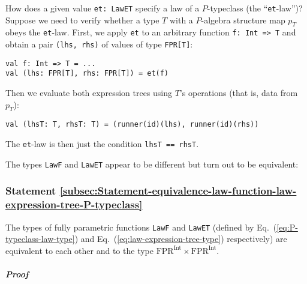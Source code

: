 How does a given value \lstinline!et: LawET!
specify a law of a $P$-typeclass (the \textsf{``}\lstinline!et!-law\textsf{''})?
Suppose we need to verify whether a type $T$ with a $P$-algebra
structure map $p_{T}$ obeys the \lstinline!et!-law.
First, we apply \lstinline!et!
to an arbitrary function \lstinline!f: Int => T!
and obtain a pair \lstinline!(lhs, rhs)!
of values of type \lstinline!FPR[T]!:
\begin{lstlisting}
val f: Int => T = ...
val (lhs: FPR[T], rhs: FPR[T]) = et(f)
\end{lstlisting}
Then we evaluate both expression trees using $T$\textsf{'}s operations (that
is, data from $p_{T}$):
\begin{lstlisting}
val (lhsT: T, rhsT: T) = (runner(id)(lhs), runner(id)(rhs))
\end{lstlisting}
The \lstinline!et!-law
is then just the condition \lstinline!lhsT == rhsT!.

The types \lstinline!LawF!
and \lstinline!LawET! appear
to be different but turn out to be equivalent:

\subsubsection{Statement \label{subsec:Statement-equivalence-law-function-law-expression-tree-P-typeclass}\ref{subsec:Statement-equivalence-law-function-law-expression-tree-P-typeclass}}

The types of fully parametric functions \lstinline!LawF!
and \lstinline!LawET! (defined
by Eq.~(\ref{eq:P-typeclass-law-type}) and Eq.~(\ref{eq:law-expression-tree-type})
respectively) are equivalent to each other and to the type $\text{FPR}^{\text{Int}}\times\text{FPR}^{\text{Int}}$.

\subparagraph{Proof}

